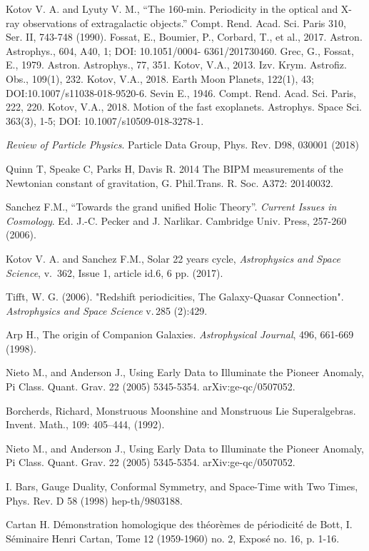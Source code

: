 \documentclass[twoside,draft]{article}
\begin{document}
{\begin{thebibliography}{99}
 Kotov V. A. and Lyuty V. M., “The 160-min. Periodicity in the optical and X-ray observations of
extragalactic objects.” Compt. Rend. Acad. Sci. Paris 310, Ser. II, 743-748 (1990). Fossat, E.,
Boumier, P., Corbard, T., et al., 2017. Astron. Astrophys., 604, A40, 1; DOI: 10.1051/0004-
6361/201730460. Grec, G., Fossat, E., 1979. Astron. Astrophys., 77, 351. Kotov, V.A., 2013.
Izv. Krym. Astrofiz. Obs., 109(1), 232. Kotov, V.A., 2018. Earth Moon Planets, 122(1), 43;
DOI:10.1007/s11038-018-9520-6. Sevin E., 1946. Compt. Rend. Acad. Sci. Paris, 222, 220.
Kotov, V.A., 2018. Motion of the fast exoplanets. Astrophys. Space Sci. 363(3), 1-5; DOI:
10.1007/s10509-018-3278-1. %

 \textit{Review of Particle Physics}. Particle Data Group, Phys. Rev. D98, 030001 (2018)

 Quinn T, Speake C, Parks H, Davis R. 2014 The BIPM measurements of the Newtonian
constant of gravitation, G. Phil.Trans. R. Soc. A372: 20140032. %

 Sanchez F.M., “Towards the grand unified Holic Theory”. \textit{Current Issues in Cosmology}. Ed. J.-C.
Pecker and J. Narlikar. Cambridge Univ. Press, 257-260 (2006).

 Kotov V. A. and Sanchez F.M., Solar 22 years cycle, \textit{Astrophysics and Space Science}, v.\, 362,
Issue 1, article id.6, 6 pp. (2017).

 Tifft, W. G. (2006). "Redshift periodicities, The Galaxy-Quasar Connection". \textit{Astrophysics and
Space Science} v.\,285 (2):429.

 Arp H., The origin of Companion Galaxies. \textit{Astrophysical Journal}, 496, 661-669 (1998).

 Nieto M., and Anderson J., Using Early Data to Illuminate the Pioneer Anomaly, Pi Class.
Quant. Grav. 22 (2005) 5345-5354. arXiv:ge-qc/0507052.

 Borcherds, Richard, Monstruous Moonshine and Monstruous Lie Superalgebras. Invent.
Math., 109: 405–444, (1992).

 Nieto M., and Anderson J., Using Early Data to Illuminate the Pioneer Anomaly, Pi Class.
Quant. Grav. 22 (2005) 5345-5354. arXiv:ge-qc/0507052.

 I. Bars, Gauge Duality, Conformal Symmetry, and Space-Time with Two Times, Phys. Rev. D
58 (1998) hep-th/9803188.

 Cartan H. Démonstration homologique des théorèmes de périodicité de Bott, I. Séminaire
Henri Cartan, Tome 12 (1959-1960) no. 2, Exposé no. 16, p. 1-16.


\end{thebibliography}}
\end{document}
